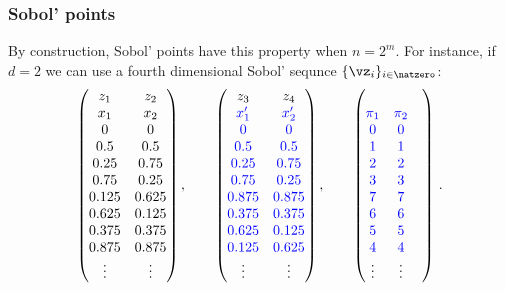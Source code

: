 \documentclass[11pt,compress]{beamer} %
\begin{document}
\begin{frame}
\frametitle{Sobol' points}
By construction, Sobol' points have this property when $n=2^m$. For instance, if $d=2$ we can use a fourth dimensional Sobol' sequnce $\{\vz_i\}_{i\in\natzero}$:
\begin{equation*}
\begin{pmatrix}
z_1 & z_2 \\
x_1 & x_2 \\
0 & 0 \\
0.5 & 0.5  \\
0.25 & 0.75 \\
0.75 & 0.25 \\
0.125 & 0.625 \\
0.625 & 0.125 \\
0.375 & 0.375 \\
0.875 & 0.875 \\
\vdots & \vdots
\end{pmatrix},\qquad
\begin{pmatrix}
z_3 & z_4 \\
\color{blue} x'_1 & \color{blue} x'_2 \\
\color{blue} 0 & \color{blue} 0 \\
\color{blue} 0.5 & \color{blue} 0.5  \\
\color{blue} 0.25 & \color{blue} 0.75 \\
\color{blue} 0.75 & \color{blue} 0.25 \\
\color{blue} 0.875 & \color{blue} 0.875 \\
\color{blue} 0.375 & \color{blue} 0.375 \\
\color{blue} 0.625 & \color{blue} 0.125 \\
\color{blue} 0.125 & \color{blue} 0.625 \\
\vdots & \vdots
\end{pmatrix}, \qquad
\begin{pmatrix}
&& \\
\color{blue} \pi_1 & \color{blue} \pi_2 \\
\color{blue} 0 & \color{blue} 0 \\
\color{blue} 1 & \color{blue} 1 \\
\color{blue} 2 & \color{blue} 2 \\
\color{blue} 3 & \color{blue} 3 \\
\color{blue} 7 & \color{blue} 7 \\
\color{blue} 6 & \color{blue} 6 \\
\color{blue} 5 & \color{blue} 5 \\
\color{blue} 4 & \color{blue} 4 \\
\vdots & \vdots \\
\end{pmatrix}\, .
\end{equation*}
\end{frame}
\end{document}
